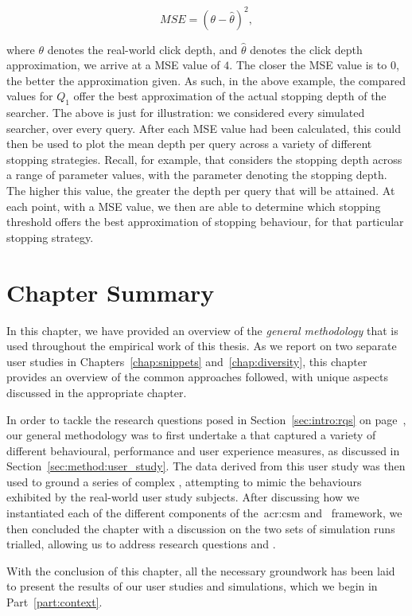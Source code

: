 \begin{equation*}
MSE = (\theta - \hat{\theta})^{2},
\end{equation*}

where $\theta$ denotes the real-world click depth, and $\hat{\theta}$ denotes the click depth approximation, we arrive at a MSE value of $4$. The closer the MSE value is to $0$, the better the approximation given. As such, in the above example, the compared values for $Q_1$ offer the best approximation of the actual stopping depth of the searcher. The above is just for illustration: we considered every simulated searcher, over every query. After each MSE value had been calculated, this could then be used to plot the mean depth per query across a variety of different stopping strategies. Recall, for example, that  considers the stopping depth across a range of parameter values, with the parameter denoting the stopping depth. The higher this value, the greater the depth per query that will be attained. At each point, with a MSE value, we then are able to determine which stopping threshold offers the best approximation of stopping behaviour, for that particular stopping strategy.

\section{Chapter Summary}
In this chapter, we have provided an overview of the \emph{general methodology} that is used throughout the empirical work of this thesis. As we report on two separate user studies in Chapters~\ref{chap:snippets} and~\ref{chap:diversity}, this chapter provides an overview of the common approaches followed, with unique aspects discussed in the appropriate chapter.

In order to tackle the research questions posed in Section~\ref{sec:intro:rqs} on page~\pageref{sec:intro:rqs}, our general methodology was to first undertake a  that captured a variety of different behavioural, performance and user experience measures, as discussed in Section~\ref{sec:method:user_study}. The data derived from this user study was then used to ground a series of complex , attempting to mimic the behaviours exhibited by the real-world user study subjects. After discussing how we instantiated each of the different components of the~\gls{acr:csm} and \simiir~framework, we then concluded the chapter with a discussion on the two sets of simulation runs trialled, allowing us to address research questions  and .

With the conclusion of this chapter, all the necessary groundwork has been laid to present the results of our user studies and simulations, which we begin in Part~\ref{part:context}.

